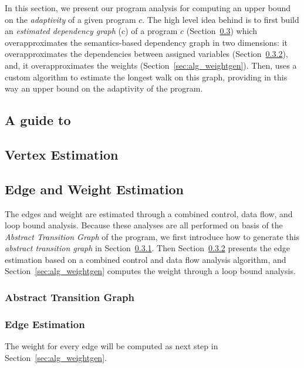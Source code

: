 In this section, we present our program analysis {\THESYSTEM} for
computing an upper bound on the \emph{adaptivity} of a given program
$c$.  The high level idea behind {\THESYSTEM} is to first build
an \emph{estimated dependency graph} \progG(c) of a program $c$
(Section~\ref{sec:alg_weightedgegen}) which overapproximates the
semantics-based dependency graph in two dimensions: it
overapproximates the dependencies between assigned variables (Section~\ref{sec:alg_edgegen}), and, it
overapproximates the weights (Section~\ref{sec:alg_weightgen}). Then, {\THESYSTEM} uses a custom algorithm to estimate the longest
walk on this graph, providing in this way an upper bound on the adaptivity of the
program.
%
\subsection{A guide to {\THESYSTEM}}
\label{sec:alg_guide}


\subsection{Vertex Estimation}
\label{sec:alg_vertexgen}



\subsection{Edge and Weight Estimation}
\label{sec:alg_weightedgegen}
The edges and weight are estimated through a combined control, data flow, and loop bound analysis.
Because these analyses are all performed on basis of the \emph{Abstract Transition Graph} of the program, we first introduce how to generate this \emph{abstract transition graph} in Section~\ref{sec:alg_abscfg}.
Then Section~\ref{sec:alg_edgegen} presents the edge estimation based on a combined control and data flow analysis algorithm,
and Section~\ref{sec:alg_weightgen}
computes the weight through a loop bound analysis.

\subsubsection{Abstract Transition Graph}
\label{sec:alg_abscfg}

%
\subsubsection{Edge Estimation}
\label{sec:alg_edgegen}
% 
The weight for every edge will be computed as next step in Section~\ref{sec:alg_weightgen}.
%

